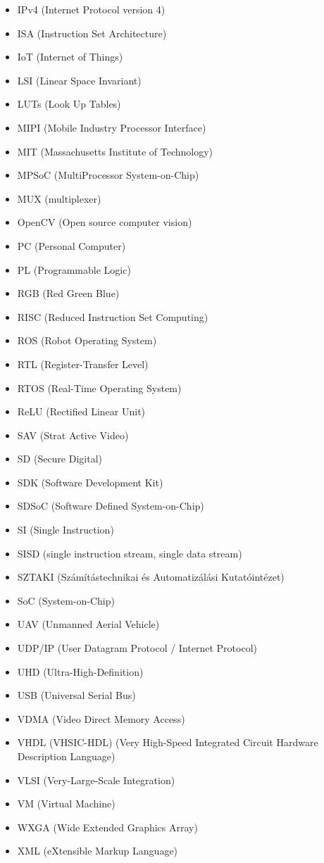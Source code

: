 \begin{multicols}{2}
\begin{itemize}
\item IPv4 (Internet Protocol version 4)
\item ISA (Instruction Set Architecture)
\item IoT (Internet of Things)
\item LSI (Linear Space Invariant)
\item LUTs (Look Up Tables)
\item MIPI (Mobile Industry Processor Interface)
\item MIT (Massachusetts Institute of Technology)
\item MPSoC (MultiProcessor System-on-Chip)
\item MUX (multiplexer)
\item OpenCV (Open source computer vision)
\item PC (Personal Computer)
\item PL (Programmable Logic)
\item RGB (Red Green Blue)
\item RISC (Reduced Instruction Set Computing)
\item ROS (Robot Operating System)
\item RTL (Register-Transfer Level)
\item RTOS (Real-Time Operating System)
\item ReLU (Rectified Linear Unit)
\item SAV (Strat Active Video)
\item SD (Secure Digital)
\item SDK (Software Development Kit)
\item SDSoC (Software Defined System-on-Chip)
\item SI (Single Instruction)
\item SISD (single instruction stream, single data stream)
\item SZTAKI (Számítástechnikai és Automatizálási Kutatóintézet)
\item SoC (System-on-Chip)
\item UAV (Unmanned Aerial Vehicle)
\item UDP/IP (User Datagram Protocol / Internet Protocol)
\item UHD (Ultra-High-Definition)
\item USB (Universal Serial Bus)
\item VDMA (Video Direct Memory Access)
\item VHDL (VHSIC-HDL) (Very High-Speed Integrated Circuit Hardware Description Language)
\item VLSI (Very-Large-Scale Integration)
\item VM (Virtual Machine)
\item WXGA (Wide Extended Graphics Array)
\item XML (eXtensible Markup Language)
\end{itemize}

\end{multicols}


